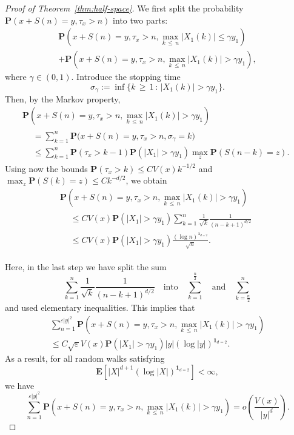 \documentclass[AHL,Unicode,longabstracts,published]{cedram}
\newcommand{\pr}{\mathbf{P}}
\newcommand{\e}{\mathbf{E}}
\newcommand{\ind}{\mathbf{1}}
\renewcommand{\le}{\leqslant}
\renewcommand{\ge}{\geqslant}
\begin{document}
\begin{proof}[Proof of Theorem~\ref{thm:half-space}]
We first split the probability $\pr(x+S(n)=y,\tau_x>n)$ into two parts:
\begin{multline*}
\pr\left(x+S(n)=y,\tau_x>n,\max_{k\,\le\,n}\left| X_1(k)\right|\le\gamma y_1\right)\\
+\pr\left(x+S(n)
=y,\tau_x>n,\max_{k\,\le\,n}\left| X_1(k)\right|>\gamma y_1\right),
\end{multline*}
where $\gamma\in(0,1)$. Introduce the stopping time
\[
\sigma_\gamma:=\inf\big\{k\,\ge\,1\,:\,\left| X_1(k)\right|>\gamma y_1\big\}.
\]
Then, by the Markov property,
\begin{multline*}
\pr\left(x+S(n)=y,\tau_x>n,\max_{k\,\le\,n}\left| X_1(k)\right|>\gamma y_1\right)\\
\begin{aligned}
& =\sum_{k=1}^n \pr\big(x+S(n)=y,\tau_x>n,\sigma_\gamma=k\big)\\
& \le\sum_{k=1}^n\pr\left(\tau_x>k-1\right)\pr\left(\left|X_1\right|>\gamma y_1\right)\max_z\pr\left(S(n-k)=z\right).
\end{aligned}
\end{multline*}
Using now the bounds $\pr(\tau_x>k)\le CV(x)k^{-1/2}$ and $\max_z\pr(S(k)=z)\le Ck^{-d/2}$, we obtain
\begin{multline*}
\pr\left(x+S(n)=y,\tau_x>n,\max_{k\,\le\,n}\left| X_1(k)\right|>\gamma y_1\right)\\
\begin{aligned}
&\le CV(x)\pr\left(|X_1|>\gamma y_1\right)\sum_{k=1}^n\frac{1}{\sqrt{k}}\frac{1}{(n-k+1)^{d/2}}\\
&\le C V(x)\pr\left(| X_1|>\gamma y_1\right)\frac{(\log n)^{\ind_{d=2}}}{\sqrt{n}}.
\end{aligned}
\end{multline*}

Here, in the last step we have split the sum
\[
\sum_{k=1}^n\frac{1}{\sqrt{k}}\frac{1}{(n-k+1)^{d/2}}\quad\text{into}\quad\sum_{k=1}^\frac{n}{2}\quad\text{and}\quad\sum_{k=\frac{n}{2}}^n
\]
and used elementary inequalities. This implies that
\begin{multline}\label{eq:new.est.2}
\sum_{n=1}^{\varepsilon|y|^2}\pr\left(x+S(n)=y,\tau_x>n,\max_{k\,\le\,n}| X_1(k)|>\gamma y_1\right)\\
\le C\sqrt{\varepsilon}V(x)\pr\left(| X_1|>\gamma y_1\right)|y|\left(\log |y|\right)^{\ind_{d=2}}.
\end{multline}
As a result, for all random walks satisfying
\[
\e\left[| X|^{d+1}\left(\log | X|\right)^{\ind_{d=2}}\right]<\infty,
\]
we have
\begin{equation}\label{half-space.2}
\sum_{n=1}^{\varepsilon|y|^2}\pr\left(x+S(n)=y,\tau_x>n,\max_{k\,\le\,n}| X_1(k)|>\gamma y_1\right) =o\left(\frac{V(x)}{|y|^d}\right).
\end{equation}


\end{proof}
\end{document}
